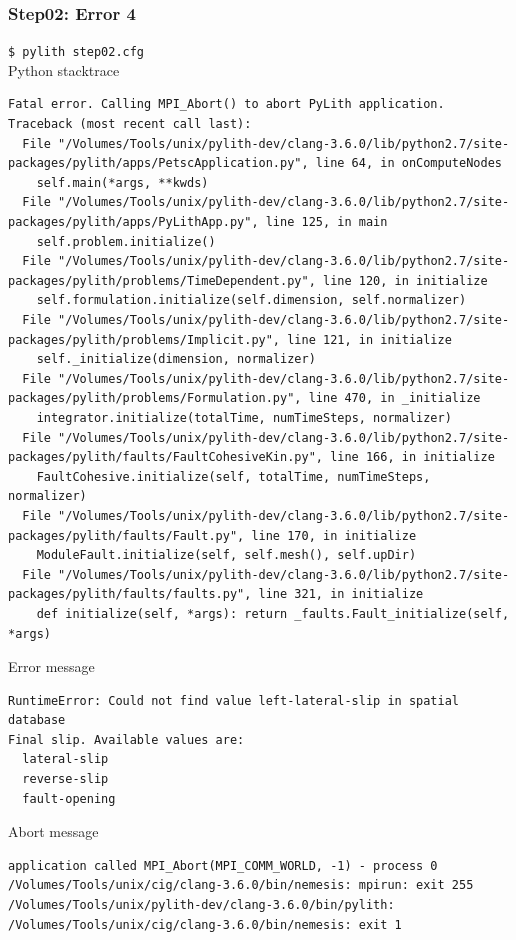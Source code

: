 \documentclass[aspectration=169]{beamer}
\newcommand{\cmd}[1]{{\footnotesize\tt \color{ltred}#1}}
\newcommand{\errlabel}[1]{{\small \color{blue}#1}}
\begin{document}
\begin{frame}[fragile]
  \frametitle{Step02: Error 4}

\cmd{\$ pylith step02.cfg}\\
\errlabel{Python stacktrace}
\begin{lstlisting}
Fatal error. Calling MPI_Abort() to abort PyLith application.
Traceback (most recent call last):
  File "/Volumes/Tools/unix/pylith-dev/clang-3.6.0/lib/python2.7/site-packages/pylith/apps/PetscApplication.py", line 64, in onComputeNodes
    self.main(*args, **kwds)
  File "/Volumes/Tools/unix/pylith-dev/clang-3.6.0/lib/python2.7/site-packages/pylith/apps/PyLithApp.py", line 125, in main
    self.problem.initialize()
  File "/Volumes/Tools/unix/pylith-dev/clang-3.6.0/lib/python2.7/site-packages/pylith/problems/TimeDependent.py", line 120, in initialize
    self.formulation.initialize(self.dimension, self.normalizer)
  File "/Volumes/Tools/unix/pylith-dev/clang-3.6.0/lib/python2.7/site-packages/pylith/problems/Implicit.py", line 121, in initialize
    self._initialize(dimension, normalizer)
  File "/Volumes/Tools/unix/pylith-dev/clang-3.6.0/lib/python2.7/site-packages/pylith/problems/Formulation.py", line 470, in _initialize
    integrator.initialize(totalTime, numTimeSteps, normalizer)
  File "/Volumes/Tools/unix/pylith-dev/clang-3.6.0/lib/python2.7/site-packages/pylith/faults/FaultCohesiveKin.py", line 166, in initialize
    FaultCohesive.initialize(self, totalTime, numTimeSteps, normalizer)
  File "/Volumes/Tools/unix/pylith-dev/clang-3.6.0/lib/python2.7/site-packages/pylith/faults/Fault.py", line 170, in initialize
    ModuleFault.initialize(self, self.mesh(), self.upDir)
  File "/Volumes/Tools/unix/pylith-dev/clang-3.6.0/lib/python2.7/site-packages/pylith/faults/faults.py", line 321, in initialize
    def initialize(self, *args): return _faults.Fault_initialize(self, *args)
\end{lstlisting}
\errlabel{Error message}
\begin{lstlisting}
RuntimeError: Could not find value left-lateral-slip in spatial database
Final slip. Available values are:
  lateral-slip
  reverse-slip
  fault-opening
\end{lstlisting}
\errlabel{Abort message}
\begin{lstlisting}
application called MPI_Abort(MPI_COMM_WORLD, -1) - process 0
/Volumes/Tools/unix/cig/clang-3.6.0/bin/nemesis: mpirun: exit 255
/Volumes/Tools/unix/pylith-dev/clang-3.6.0/bin/pylith: /Volumes/Tools/unix/cig/clang-3.6.0/bin/nemesis: exit 1
\end{lstlisting}

\end{frame}
\end{document}
